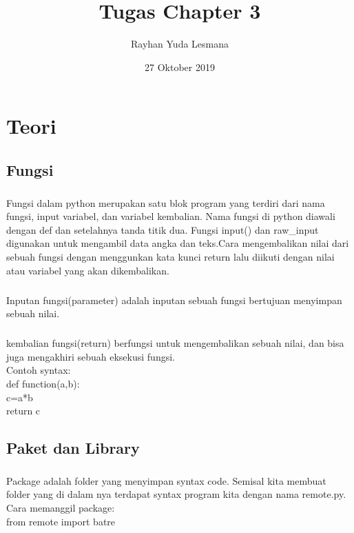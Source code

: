 \documentclass[a4paper,12pt]{report}
\title{Tugas Chapter 3}
\author{Rayhan Yuda Lesmana}
\date{27 Oktober 2019}
\begin{document}
\maketitle
\chapter*{Teori}
\section*{Fungsi}
\paragraph{}
Fungsi dalam python merupakan satu blok program yang terdiri dari nama fungsi, input variabel, dan variabel kembalian. Nama fungsi di python diawali dengan def dan setelahnya tanda titik dua. Fungsi input() dan raw\_input digunakan untuk mengambil data angka dan teks.Cara mengembalikan nilai dari sebuah fungsi dengan  menggunkan kata kunci return lalu diikuti dengan nilai atau variabel yang akan dikembalikan.\\
\paragraph{}
Inputan fungsi(parameter) adalah inputan sebuah fungsi bertujuan menyimpan sebuah nilai.\\
\paragraph{}
kembalian fungsi(return) berfungsi untuk mengembalikan sebuah nilai, dan bisa juga mengakhiri sebuah eksekusi fungsi.\\
Contoh syntax:\\
def function(a,b):\\
	c=a*b\\
	return c\\
\section*{Paket dan Library}
\paragraph{}
Package adalah folder yang menyimpan syntax code. Semisal kita membuat folder yang di dalam nya terdapat syntax program kita dengan nama remote.py.\\
Cara memanggil package:\\
from remote import batre
 
\end{document}
